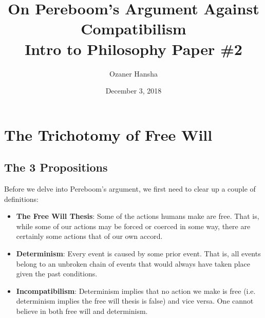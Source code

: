 \documentclass{article}
\begin{document}
\title{%
  On Pereboom's Argument Against Compatibilism \\
  \large Intro to Philosophy Paper \#2}
\author{Ozaner Hansha}
\date{December 3, 2018}
\maketitle


\section{The Trichotomy of Free Will}
\subsection{The 3 Propositions}
Before we delve into Pereboom's argument, we first need to clear up a couple of definitions:
\begin{itemize}
  \item \textbf{The Free Will Thesis}: Some of the actions humans make are free. That is, while some of our actions may be forced or coerced in some way, there are certainly some actions that of our own accord.
  \item \textbf{Determinism}: Every event is caused by some prior event. That is, all events belong to an unbroken chain of events that would always have taken place given the past conditions.
  \item \textbf{Incompatibilism}: Determinism implies that no action we make is free (i.e. determinism implies the free will thesis is false) and vice versa. One cannot believe in both free will and determinism.
\end{itemize}
\end{document}
